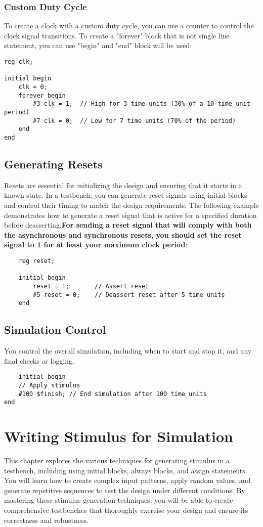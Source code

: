 \documentclass{report}
\begin{document}
\subsection{Custom Duty Cycle}
To create a clock with a custom duty cycle, you can use a counter to control the clock signal transitions. To create a "forever" block that is not single line statement, you can use "begin" and "end" block will be used:
\begin{verbatim}
reg clk;

initial begin
    clk = 0;
    forever begin
        #3 clk = 1;  // High for 3 time units (30% of a 10-time unit period)
        #7 clk = 0;  // Low for 7 time units (70% of the period)
    end
end
\end{verbatim}
\section{Generating Resets}
Resets are essential for initializing the design and ensuring that it starts in a known state. In a testbench, you can generate reset signals using initial blocks and control their timing to match the design requirements. The following example demonstrates how to generate a reset signal that is active for a specified duration before deasserting.\textbf{For sending a reset signal that will comply with both the asynchronous and synchronous resets, you should set the reset signal to 1 for at least your maximum clock period}:

\begin{verbatim}
    reg reset;

    initial begin
        reset = 1;       // Assert reset
        #5 reset = 0;    // Deassert reset after 5 time units
    end
\end{verbatim}

\section{Simulation Control}
You control the overall simulation, including when to start and stop it, and any final checks or logging.
\begin{verbatim}
    initial begin
    // Apply stimulus
    #100 $finish; // End simulation after 100 time units
end
\end{verbatim}
\chapter{Writing Stimulus for Simulation}
This chapter explores the various techniques for generating stimulus in a testbench, including using initial blocks, always blocks, and assign statements. You will learn how to create complex input patterns, apply random values, and generate repetitive sequences to test the design under different conditions. By mastering these stimulus generation techniques, you will be able to create comprehensive testbenches that thoroughly exercise your design and ensure its correctness and robustness.
\end{document}
